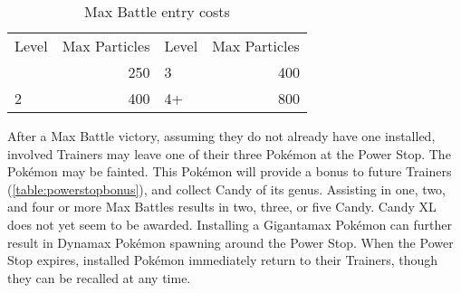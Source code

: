 \begin{table}
\centering
\begin{tabular}{lr|lr}
Level & Max Particles & Level & Max Particles\\
\Midrule
1 & 250 & 3 & 400\\
2 & 400 & 4+ & 800\\
\end{tabular}
\caption{Max Battle entry costs\label{table:maxcosts}}
\end{table}
After a Max Battle victory, assuming they do not already have one installed,
 involved Trainers may leave one of their three Pokémon at the Power Stop.
The Pokémon may be fainted.
This Pokémon will provide a bonus to future Trainers (\autoref{table:powerstopbonus}), and
  collect Candy of its genus.
Assisting in one, two, and four or more Max Battles results in two, three, or five Candy.
Candy XL does not yet seem to be awarded.
Installing a Gigantamax Pokémon can further result in Dynamax Pokémon spawning around the Power Stop.
When the Power Stop expires, installed Pokémon immediately return to their Trainers,
  though they can be recalled at any time.

